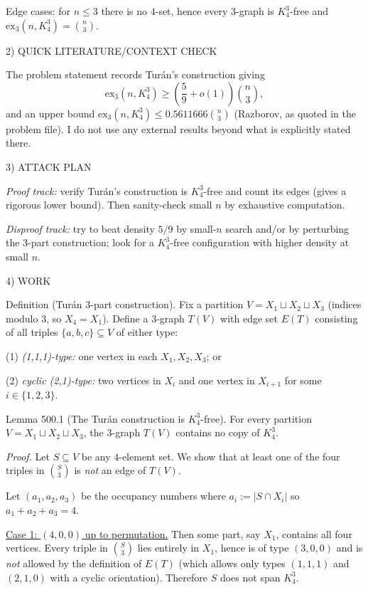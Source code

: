 Edge cases: for $n\le 3$ there is no $4$-set, hence every $3$-graph is $K_4^3$-free and $\mathrm{ex}_3(n,K_4^3)=\binom{n}{3}$.

2) QUICK LITERATURE/CONTEXT CHECK

The problem statement records Tur\'an's construction giving
\[\mathrm{ex}_3(n,K_4^3)\ge \left(\frac{5}{9}+o(1)\right)\binom{n}{3},\]
and an upper bound $\mathrm{ex}_3(n,K_4^3)\le 0.5611666\binom{n}{3}$ (Razborov, as quoted in the problem file). I do not use any external results beyond what is explicitly stated there.

3) ATTACK PLAN

\emph{Proof track:} verify Tur\'an's construction is $K_4^3$-free and count its edges (gives a rigorous lower bound). Then sanity-check small $n$ by exhaustive computation.

\emph{Disproof track:} try to beat density $5/9$ by small-$n$ search and/or by perturbing the 3-part construction; look for a $K_4^3$-free configuration with higher density at small $n$.

4) WORK

Definition (Tur\'an 3-part construction).
Fix a partition $V=X_1\sqcup X_2\sqcup X_3$ (indices modulo $3$, so $X_4=X_1$). Define a $3$-graph $T(V)$ with edge set $E(T)$ consisting of all triples $\{a,b,c\}\subseteq V$ of either type:

(1) \emph{(1,1,1)-type:} one vertex in each $X_1,X_2,X_3$; or

(2) \emph{cyclic (2,1)-type:} two vertices in $X_i$ and one vertex in $X_{i+1}$ for some $i\in\{1,2,3\}$.

Lemma 500.1 (The Tur\'an construction is $K_4^3$-free).
For every partition $V=X_1\sqcup X_2\sqcup X_3$, the $3$-graph $T(V)$ contains no copy of $K_4^3$.

\emph{Proof.}
Let $S\subseteq V$ be any $4$-element set. We show that at least one of the four triples in $\binom{S}{3}$ is \emph{not} an edge of $T(V)$.

Let $(a_1,a_2,a_3)$ be the occupancy numbers where $a_i:=\lvert S\cap X_i\rvert$ so $a_1+a_2+a_3=4$.

\underline{Case 1: $(4,0,0)$ up to permutation.}
Then some part, say $X_1$, contains all four vertices. Every triple in $\binom{S}{3}$ lies entirely in $X_1$, hence is of type $(3,0,0)$ and is \emph{not} allowed by the definition of $E(T)$ (which allows only types $(1,1,1)$ and $(2,1,0)$ with a cyclic orientation). Therefore $S$ does not span $K_4^3$.

